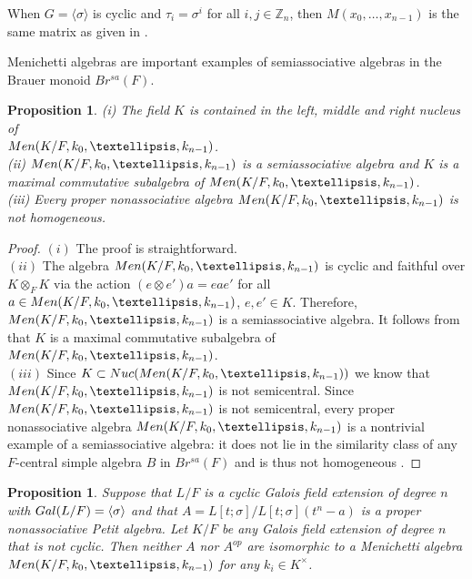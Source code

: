 \documentclass[11pt]{amsart}
\theoremstyle{plain}
\newtheorem{proposition}[theorem]{Proposition}
\theoremstyle{definition}
\begin{document}
 When $G=\langle \sigma \rangle$ is cyclic and $\tau_i=\sigma^i$ for all  $ i,j\in\mathbb{Z}_n$, then $M(x_0,\dots,x_{n-1})$ is the same matrix as given in \cite[(11)']{M}.



Menichetti algebras  are important examples of semiassociative algebras in the Brauer monoid $Br^{sa}(F)$.

\begin{proposition}\label{prop:nuc Galois}
 (i) The field $K$ is contained in the left, middle and right
 nucleus of \\
${\rm Men}(K/F,k_0,\dots, k_{n-1})$.
\\ (ii) ${\rm Men}(K/F,k_0,\dots, k_{n-1})$ is a semiassociative algebra and  $K$  is a maximal commutative subalgebra of ${\rm Men}(K/F,k_0,\dots, k_{n-1})$.
\\ (iii) Every proper nonassociative algebra ${\rm Men}(K/F,k_0,\dots, k_{n-1})$  is not homogeneous.
\end{proposition}

\begin{proof} $(i)$ The proof is straightforward.
\\ $(ii)$ The algebra ${\rm Men}(K/F,k_0,\dots, k_{n-1})$ is cyclic and faithful
over $K\otimes_F K$ via the action $(e\otimes e')a=eae'$ for all $a\in {\rm Men}(K/F,k_0,\dots, k_{n-1})$, $e,e'\in K$. Therefore,  ${\rm Men}(K/F,k_0,\dots, k_{n-1})$ is a semiassociative algebra.
 It follows from \cite[Corollary 7.3]{BHMRV} that $K$  is a maximal commutative subalgebra of ${\rm Men}(K/F,k_0,\dots, k_{n-1})$.
\\ $(iii)$  Since $K\subset {\rm Nuc}({\rm Men}(K/F,k_0,\dots, k_{n-1}))$ we know that ${\rm Men}(K/F,k_0,\dots, k_{n-1})$ is not semicentral.
Since ${\rm Men}(K/F,k_0,\dots, k_{n-1})$  is not semicentral, every proper nonassociative algebra ${\rm Men}(K/F,k_0,\dots, k_{n-1})$ is a nontrivial example of a semiassociative algebra: it does not lie in the similarity class of any $F$-central simple algebra $B$ in $Br^{sa}(F)$ and is thus not homogeneous \cite{BHMRV}.
 \end{proof}



  \begin{proposition}\label{prop:noncylic}
Suppose that $L/F$ is a cyclic Galois field extension of degree $n$ with ${\rm Gal}(L/F)=\langle \sigma\rangle$ and that $A=L[t;\sigma]/L[t;\sigma](t^n-a)$ is a proper nonassociative Petit algebra.
 Let $K/F$ be any Galois field extension of degree $n$ that is not cyclic. Then neither $A$ nor $A^{op}$ are isomorphic to a Menichetti algebra  ${\rm Men}(K/F, k_0,\dots,k_{n-1})$ for any $k_i\in K^\times$.
\end{proposition}
\end{document}
